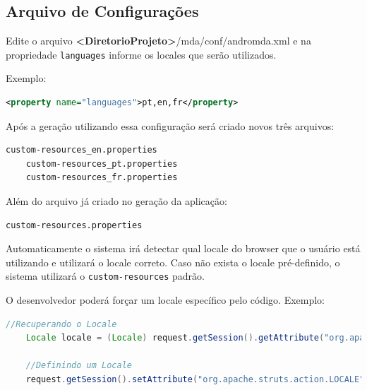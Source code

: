 \subsection{Arquivo de Configurações}

Edite o arquivo \textbf{<DiretorioProjeto>}/mda/conf/andromda.xml e na
propriedade \texttt{languages} informe os locales que serão utilizados.

Exemplo:

\begin{lstlisting}[language=xml, frame=single, breaklines=true]
	<property name="languages">pt,en,fr</property>
\end{lstlisting}

Após a geração utilizando essa configuração será criado novos três arquivos: 

\begin{lstlisting}[language=xml, frame=single, breaklines=true]
	custom-resources_en.properties
	custom-resources_pt.properties
	custom-resources_fr.properties
\end{lstlisting}

Além do arquivo já criado no geração da aplicação:

\begin{lstlisting}[language=xml, frame=single, breaklines=true]
	custom-resources.properties
\end{lstlisting}

Automaticamente o sistema irá detectar qual locale do browser que o usuário está
utilizando e utilizará o locale correto. Caso não exista o locale pré-definido,
o sistema utilizará o \texttt{custom-resources} padrão.

O desenvolvedor poderá forçar um locale específico pelo código. Exemplo: 

\begin{lstlisting}[language=java, frame=single, breaklines=true]
	//Recuperando o Locale
	Locale locale = (Locale) request.getSession().getAttribute("org.apache.struts.action.LOCALE");

	//Definindo um Locale
	request.getSession().setAttribute("org.apache.struts.action.LOCALE", new Locale("pt", "BR"));
\end{lstlisting}
